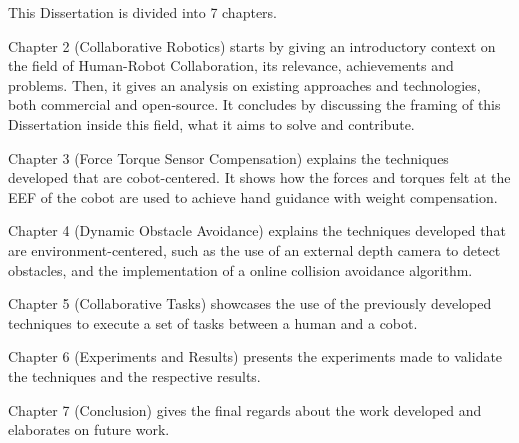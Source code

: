 \par This Dissertation is divided into 7 chapters.
\par Chapter 2 (Collaborative Robotics) starts by giving an introductory context on the field of Human-Robot Collaboration, its relevance, achievements and problems. Then, it gives an analysis on existing approaches and technologies, both commercial and open-source. It concludes by discussing the framing of this Dissertation inside this field, what it aims to solve and contribute.
\par Chapter 3 (Force Torque Sensor Compensation) explains the techniques developed that are cobot-centered. It shows how the forces and torques felt at the EEF of the cobot are used to achieve hand guidance with weight compensation.
\par Chapter 4 (Dynamic Obstacle Avoidance) explains the techniques developed that are environment-centered, such as the use of an external depth camera to detect obstacles, and the implementation of a online collision avoidance algorithm.
\par Chapter 5 (Collaborative Tasks) showcases the use of the previously developed techniques to execute a set of tasks between a human and a cobot.
\par Chapter 6 (Experiments and Results) presents the experiments made to validate the techniques and the respective results.
\par Chapter 7 (Conclusion) gives the final regards about the work developed and elaborates on future work.
